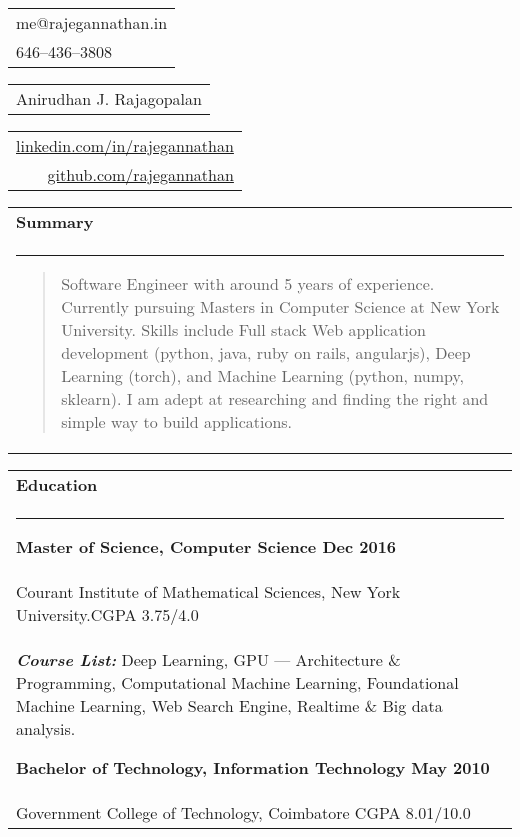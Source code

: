 \documentclass{article}
\begin{document}
{\small\begin{tabular}[c]{l}
	me@rajegannathan.in \\
	646--436--3808
\end{tabular}}\hfill%
{\Large\bfseries\begin{tabular}[c]{c}
	Anirudhan J. Rajagopalan
\end{tabular}}\hfill%
{\small\begin{tabular}[c]{r}
	\href{https://linkedin.com/in/rajegannathan}{linkedin.com/in/rajegannathan} \\
	\href{https://github.com/rajegannathan}{github.com/rajegannathan}
\end{tabular}}%

\bigskip

\begin{tabular}{p{\dimexpr\linewidth-2\tabcolsep}}
	\textbf{\large{Summary}}\\
	\noindent\rule{\textwidth}{0.4pt}
	\begin{quote}
	\small{Software Engineer with around 5 years of experience.  Currently pursuing Masters in Computer Science at New York University.  Skills include Full stack Web application development (python, java, ruby on rails, angularjs), Deep Learning (torch), and Machine Learning (python, numpy, sklearn).  I am adept at researching and finding the right and simple way to build applications.}
	\end{quote}
\end{tabular}

\begin{tabular}{p{\dimexpr\linewidth-2\tabcolsep}}
	\textbf{\large{Education}} \\
	\noindent\rule{\textwidth}{0.4pt}
	{\bfseries Master of Science, Computer Science \hfill Dec 2016} \\
	\quad Courant Institute of Mathematical Sciences, New York University.\hfill CGPA 3.75/4.0\\
	\quad \textbf{\textit{Course List:}} Deep Learning, GPU --- Architecture \& Programming, Computational Machine Learning, Foundational Machine Learning, Web Search Engine, Realtime \& Big data analysis.

	\smallskip
	{\bfseries Bachelor of Technology, Information Technology \hfill May 2010} \\
	\quad Government College of Technology, Coimbatore \hfill CGPA 8.01/10.0
\end{tabular}

\bigskip
\end{document}
